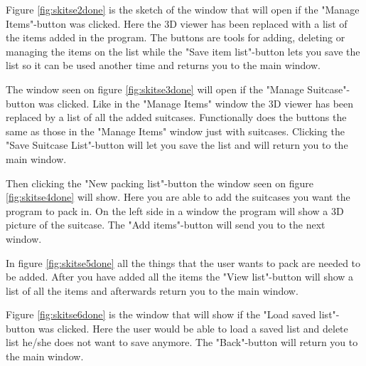 
Figure \ref{fig:skitse2done} is the sketch of the window that will open if the "Manage Items"-button was clicked. Here the 3D viewer has been replaced with a list of the items added in the program. The buttons are tools for adding, deleting or managing the items on the list while the "Save item list"-button lets you save the list so it can be used another time and returns you to the main window.


The window seen on figure \ref{fig:skitse3done} will open if the "Manage Suitcase"-button was clicked. Like in the "Manage Items" window the 3D viewer has been replaced by a list of all the added suitcases. Functionally does the buttons the same as those in the "Manage Items" window just with suitcases. Clicking the "Save Suitcase List"-button will let you save the list and will return you to the main window.


Then clicking the "New packing list"-button the window seen on figure \ref{fig:skitse4done} will show. Here you are able to add the suitcases you want the program to pack in. On the left side in a window the program will show a 3D picture of the suitcase. The "Add items"-button will send you to the next window.


In figure \ref{fig:skitse5done} all the things that the user wants to pack are needed to be added. After you have added all the items the "View list"-button will show a list of all the items and afterwards return you to the main window.


Figure \ref{fig:skitse6done} is the window that will show if the "Load saved list"-button was clicked. Here the user would be able to load a saved list and delete list he/she does not want to save anymore. The "Back"-button will return you to the main window.


